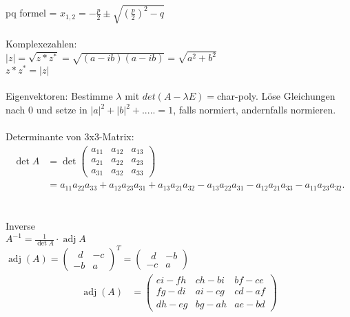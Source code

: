 \documentclass[10pt,a4paper]{article}
\begin{document}
%
pq formel = $x_{1,2} = - \frac{p}{2}\pm\sqrt{\left(\frac{p}2\right)^2 - q}$\\
%
\\
Komplexezahlen:\\
$|z|=\sqrt{z*z^*}=\sqrt{(a-ib)(a-ib)}=\sqrt{a^2+b^2}$\\
$z*z^*=|z|$\\
%
\\
Eigenvektoren: Bestimme $\lambda$ mit $det(A-\lambda E)=$char-poly. Löse Gleichungen nach 0 und setze in $|a|^2+|b|^2+..... = 1$, falls normiert, andernfalls normieren.\\
%
\\
Determinante von 3x3-Matrix:\\
\begin{align}\det A &= \det \begin{pmatrix} a_{11} & a_{12} & a_{13} \\ a_{21} & a_{22} & a_{23} \\ a_{31} & a_{32} & a_{33} \end{pmatrix}\\ &= a_{11} a_{22} a_{33} +a_{12} a_{23} a_{31} + a_{13} a_{21} a_{32} - a_{13} a_{22} a_{31} - a_{12} a_{21} a_{33} - a_{11} a_{23} a_{32}.\end{align}\\
%
\\
Inverse\\
$A^{-1} = \frac{1}{\det A} \cdot \operatorname{adj} A$\\
$\operatorname{adj} (A) = \begin{pmatrix} \,\,\,{{d}} & \!\!{{-c}}\\ {{-b}} & {{a}} \end{pmatrix} ^T = \begin{pmatrix} \,\,\,{{d}} & \!\!{{-b}}\\ {{-c}} & {{a}} \end{pmatrix}$\\
\begin{align}\operatorname{adj} (A)& =\begin{pmatrix}ei - fh & ch - bi & bf - ce \\fg - di & ai - cg & cd - af \\dh - eg & bg - ah & ae - bd\end{pmatrix}\end{align}
\end{document}
